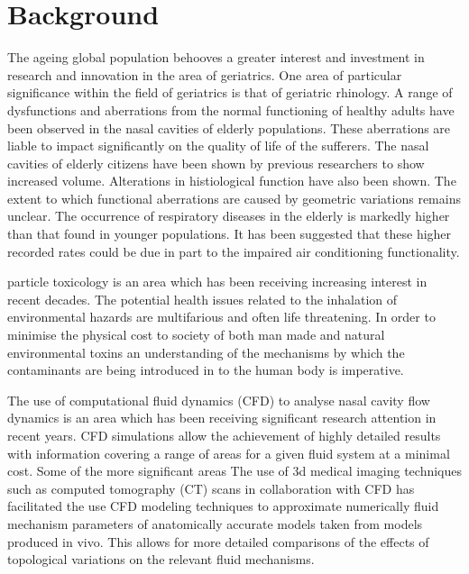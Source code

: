 \section{Background}

The ageing global population behooves a greater interest and investment in research and innovation in the area of geriatrics. One area of particular significance within the field of geriatrics is that of geriatric rhinology. A range of dysfunctions and aberrations from the normal functioning of healthy adults have been observed in the nasal cavities of elderly populations\cite{Edelstein1996, Lindemann2008}. These aberrations are liable to impact significantly on the quality of life of the sufferers. The nasal cavities of elderly citizens have been shown by previous researchers to show increased volume\cite{Kalmovich2005}. Alterations in histiological function have also been shown\cite{HO2001}. The extent to which functional aberrations are caused by geometric variations remains unclear\cite{Varga-Huettner2013}. The occurrence of respiratory diseases in the elderly is markedly higher than that found in younger populations\cite{HO2001, Edelstein1996}. It has been suggested that these higher recorded rates could be due in part to the impaired air conditioning functionality\cite{Lindemann2008}.

particle toxicology is an area which has been receiving increasing interest in recent decades. The potential health issues related to the inhalation of environmental hazards are multifarious and often life threatening. In order to minimise the physical cost to society of both man made and natural environmental toxins an understanding of the mechanisms by which the contaminants are being introduced in to the human body is imperative.

The use of computational fluid dynamics (CFD) to analyse nasal cavity flow dynamics is an area which has been receiving significant research attention in recent years. CFD simulations allow the achievement of highly detailed results with information covering a range of areas for a given fluid system at a minimal cost. Some of the more significant areas The use of 3d medical imaging techniques such as computed tomography (CT) scans in collaboration with CFD has facilitated the use CFD modeling techniques to approximate numerically fluid mechanism parameters of anatomically accurate models taken from models produced in vivo. This allows for more detailed comparisons of the effects of topological variations on the relevant fluid mechanisms.


